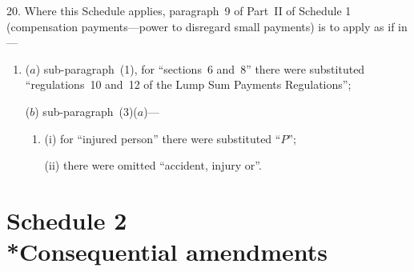 \documentclass[12pt,a4paper]{article}
\begin{document}
\medskip

20.  Where this Schedule applies, paragraph~9 of Part~II of Schedule 1 (compensation payments---power to disregard small payments) is to apply as if in—
\begin{enumerate}\item[]
($a$) sub-paragraph~(1), for “sections~6 and~8” there were substituted “regulations~10 and~12 of the Lump Sum Payments Regulations”;

($b$) sub-paragraph~(3)($a$)—
\begin{enumerate}\item[]
(i) for “injured person” there were substituted “$P$”;

(ii) there were omitted “accident, injury or”.
\end{enumerate}
\end{enumerate}

\part[Schedule 2 --- Consequential amendments]{Schedule 2\\*Consequential amendments}

\renewcommand\parthead{--- Schedule 2}
\end{document}
